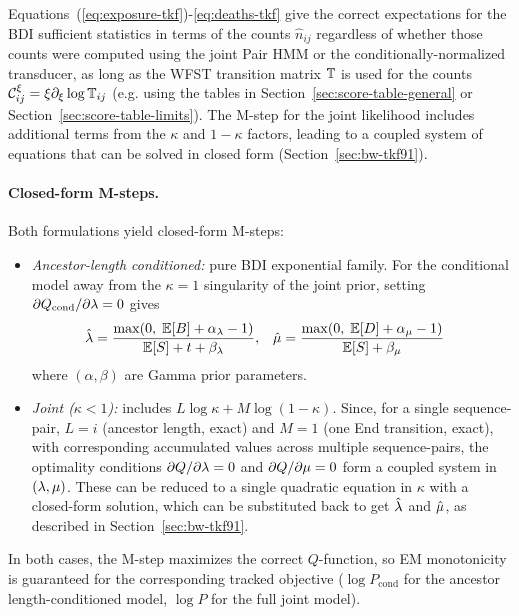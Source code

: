 Equations~(\ref{eq:exposure-tkf})-\ref{eq:deaths-tkf} give the correct expectations for the BDI sufficient statistics
in terms of the counts $\hat{n}_{ij}$ regardless of whether those counts were computed using the joint Pair HMM or the conditionally-normalized transducer,
as long as the WFST transition matrix $\mathbb{T}$ is used for the counts $\mathcal{C}^\xi_{ij} = \xi \partial_\xi \log \mathbb{T}_{ij}$
(e.g. using the tables in Section~\ref{sec:score-table-general} or Section~\ref{sec:score-table-limits}).
The M-step for the joint likelihood includes additional terms from the $\kappa$ and $1{-}\kappa$ factors, leading to a coupled system of equations that can be solved in closed form (Section~\ref{sec:bw-tkf91}).

\paragraph{Closed-form M-steps.}
Both formulations yield closed-form M-steps:
\begin{itemize}
\item \emph{Ancestor-length conditioned:} pure BDI exponential family.
  For the conditional model away from the $\kappa=1$ singularity of the joint prior,
  setting $\partial Q_{\mathrm{cond}}/\partial\lambda = 0$ gives
  \begin{align}
  \hat{\lambda} &= \frac{\max(0,\;\mathbb{E}[B] + \alpha_\lambda - 1)}
                       {\mathbb{E}[S] + t + \beta_\lambda}, &
  \hat{\mu} &= \frac{\max(0,\;\mathbb{E}[D] + \alpha_\mu - 1)}
                       {\mathbb{E}[S] + \beta_\mu}
  \label{eq:mstep-cond}
  \end{align}
  where $(\alpha,\beta)$ are Gamma prior parameters.

\item \emph{Joint ($\kappa < 1$):}
  includes $L \log\kappa + M \log(1{-}\kappa)$.
  Since, for a single sequence-pair, $L  = i$ (ancestor length, exact) and
  $M  = 1$ (one End transition, exact),
  with corresponding accumulated values across multiple sequence-pairs,
  the optimality conditions
  $\partial Q/\partial\lambda = 0$ and $\partial Q/\partial\mu = 0$
  form a coupled system in $(\lambda,\mu)$.
  These can be reduced to a single quadratic equation in $\kappa$ with a closed-form solution, which can be substituted back to get $\hat{\lambda}$ and $\hat{\mu}$,
  as described in Section~\ref{sec:bw-tkf91}.
\end{itemize}
In both cases, the M-step maximizes the correct
$Q$-function, so EM monotonicity is guaranteed for
the corresponding tracked objective
($\log P_{\mathrm{cond}}$ for the ancestor length-conditioned model, $\log P$ for the full joint model).
